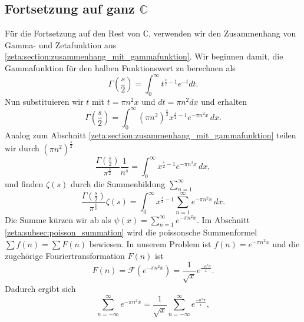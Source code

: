 \subsection{Fortsetzung auf ganz $\mathbb{C}$} \label{zeta:subsection:auf_ganz}
Für die Fortsetzung auf den Rest von $\mathbb{C}$, verwenden wir den Zusammenhang von Gamma- und Zetafunktion aus \ref{zeta:section:zusammenhang_mit_gammafunktion}.
Wir beginnen damit, die Gammafunktion für den halben Funktionswert zu berechnen als
\begin{equation}
    \Gamma \left( \frac{s}{2} \right)
    =
    \int_0^{\infty} t^{\frac{s}{2}-1} e^{-t} dt.
\end{equation}
Nun substituieren wir $t$ mit $t = \pi n^2 x$ und $dt=\pi n^2 dx$ und erhalten
\begin{equation}
    \Gamma \left( \frac{s}{2} \right)
    =
    \int_0^{\infty}
    (\pi n^2)^{\frac{s}{2}}
    x^{\frac{s}{2}-1}
    e^{-\pi n^2 x}
    \,dx.
\end{equation}
Analog zum Abschnitt \ref{zeta:section:zusammenhang_mit_gammafunktion} teilen wir durch $(\pi n^2)^{\frac{s}{2}}$
\begin{equation}
    \frac{\Gamma \left( \frac{s}{2} \right)}{\pi^{\frac{s}{2}}}
    \frac{1}{n^s}
     =
    \int_0^{\infty}
    x^{\frac{s}{2}-1}
    e^{-\pi n^2 x}
    \,dx,
\end{equation}
und finden $\zeta(s)$ durch die Summenbildung $\sum_{n=1}^{\infty}$
\begin{equation}
    \frac{\Gamma \left( \frac{s}{2} \right)}{\pi^{\frac{s}{2}}}
    \zeta(s)
    =
    \int_0^{\infty}
    x^{\frac{s}{2}-1}
    \sum_{n=1}^{\infty}
    e^{-\pi n^2 x}
    \,dx. \label{zeta:equation:integral1}
\end{equation}
Die Summe kürzen wir ab als $\psi(x) = \sum_{n=1}^{\infty} e^{-\pi n^2 x}$.
Im Abschnitt \ref{zeta:subsec:poisson_summation} wird die poissonsche Summenformel $\sum f(n) = \sum F(n)$ bewiesen.
In unserem Problem ist $f(n) =  e^{-\pi n^2 x}$ und die zugehörige Fouriertransformation $F(n)$ ist
\begin{equation}
    F(n)
    =
    \mathcal{F}
    (
    e^{-\pi n^2 x}
    )
    =
    \frac{1}{\sqrt{x}}
    e^{\frac{-n^2 \pi}{x}}.
\end{equation}
Dadurch ergibt sich
\begin{equation}\label{zeta:equation:psi}
    \sum_{n=-\infty}^{\infty}
    e^{-\pi n^2 x}
    =
    \frac{1}{\sqrt{x}}
    \sum_{n=-\infty}^{\infty}
    e^{\frac{-n^2 \pi}{x}},
\end{equation}
